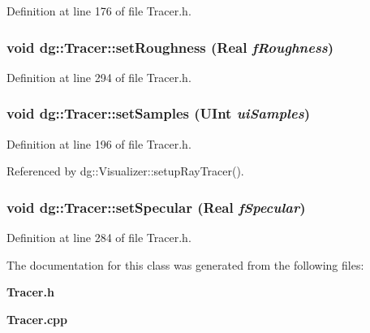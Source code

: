Definition at line 176 of file Tracer.h.
\subsubsection{\setlength{\rightskip}{0pt plus 5cm}void dg::Tracer::set\-Roughness ({\bf Real} {\em f\-Roughness})\hspace{0.3cm}{\tt  [inline]}}\label{classdg_1_1Tracer_a29}




Definition at line 294 of file Tracer.h.
\subsubsection{\setlength{\rightskip}{0pt plus 5cm}void dg::Tracer::set\-Samples ({\bf UInt} {\em ui\-Samples})\hspace{0.3cm}{\tt  [inline]}}\label{classdg_1_1Tracer_a15}




Definition at line 196 of file Tracer.h.

Referenced by dg::Visualizer::setup\-Ray\-Tracer().
\subsubsection{\setlength{\rightskip}{0pt plus 5cm}void dg::Tracer::set\-Specular ({\bf Real} {\em f\-Specular})\hspace{0.3cm}{\tt  [inline]}}\label{classdg_1_1Tracer_a27}




Definition at line 284 of file Tracer.h.

The documentation for this class was generated from the following files:\begin{CompactItemize}
\item 
{\bf Tracer.h}\item 
{\bf Tracer.cpp}\end{CompactItemize}
